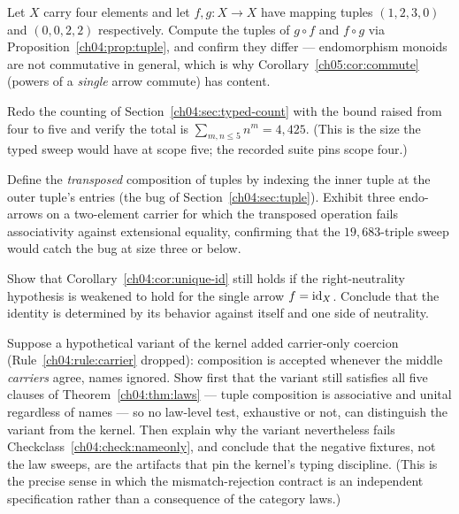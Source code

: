 \begin{exercise}
\label{ch04:ex:compute}
Let $X$ carry four elements and let $f, g : X \to X$ have mapping tuples
$(1, 2, 3, 0)$ and $(0, 0, 2, 2)$ respectively. Compute the tuples of
$g \circ f$ and $f \circ g$ via Proposition~\ref{ch04:prop:tuple}, and
confirm they differ --- endomorphism monoids are not commutative in
general, which is why Corollary~\ref{ch05:cor:commute} (powers of a
\emph{single} arrow commute) has content.
\end{exercise}

\begin{exercise}
\label{ch04:ex:count5}
Redo the counting of Section~\ref{ch04:sec:typed-count} with the bound
raised from four to five and verify the total is
$\sum_{m,n \le 5} n^{m} = 4{,}425$. (This is the size the typed sweep
would have at scope five; the recorded suite pins scope four.)
\end{exercise}

\begin{exercise}
\label{ch04:ex:transposed}
Define the \emph{transposed} composition of tuples by indexing the inner
tuple at the outer tuple's entries (the bug of
Section~\ref{ch04:sec:tuple}). Exhibit three endo-arrows on a two-element
carrier for which the transposed operation fails associativity against
extensional equality, confirming that the $19{,}683$-triple sweep would
catch the bug at size three or below.
\end{exercise}

\begin{exercise}
\label{ch04:ex:uniqueid}
Show that Corollary~\ref{ch04:cor:unique-id} still holds if the
right-neutrality hypothesis is weakened to hold for the single arrow
$f = \mathrm{id}_X$. Conclude that the identity is determined by its behavior
against itself and one side of neutrality.
\end{exercise}

\begin{exercise}
\label{ch04:ex:coercion}
Suppose a hypothetical variant of the kernel added carrier-only coercion
(Rule~\ref{ch04:rule:carrier} dropped): composition is accepted whenever
the middle \emph{carriers} agree, names ignored. Show first that the
variant still satisfies all five clauses of
Theorem~\ref{ch04:thm:laws} --- tuple composition is associative and
unital regardless of names --- so no law-level test, exhaustive or not,
can distinguish the variant from the kernel. Then explain why the variant
nevertheless fails Checkclass~\ref{ch04:check:nameonly}, and conclude that
the negative fixtures, not the law sweeps, are the artifacts that pin the
kernel's typing discipline. (This is the precise sense in which the
mismatch-rejection contract is an independent specification rather than a
consequence of the category laws.)
\end{exercise}

